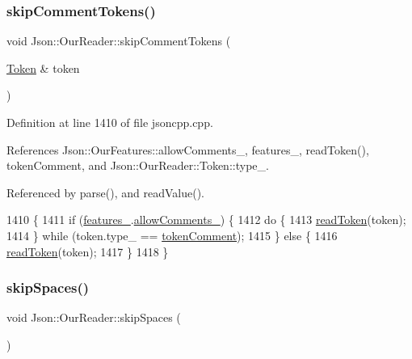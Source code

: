 \subsubsection{\texorpdfstring{skip\+Comment\+Tokens()}{skipCommentTokens()}}
{\footnotesize\ttfamily void Json\+::\+Our\+Reader\+::skip\+Comment\+Tokens (\begin{DoxyParamCaption}\item[{\hyperlink{class_json_1_1_our_reader_1_1_token}{Token} \&}]{token }\end{DoxyParamCaption})\hspace{0.3cm}{\ttfamily [private]}}



Definition at line 1410 of file jsoncpp.\+cpp.



References Json\+::\+Our\+Features\+::allow\+Comments\+\_\+, features\+\_\+, read\+Token(), token\+Comment, and Json\+::\+Our\+Reader\+::\+Token\+::type\+\_\+.



Referenced by parse(), and read\+Value().


\begin{DoxyCode}
1410                                               \{
1411   \textcolor{keywordflow}{if} (\hyperlink{class_json_1_1_our_reader_a2714302d5cc54ca2ce4118ea51c0397a}{features\_}.\hyperlink{class_json_1_1_our_features_ac71bb7ba7363d3b05ed76602b036ce33}{allowComments\_}) \{
1412     \textcolor{keywordflow}{do} \{
1413       \hyperlink{class_json_1_1_our_reader_a0d1e66da47fe2e85f5033c59326dfdc3}{readToken}(token);
1414     \} \textcolor{keywordflow}{while} (token.type\_ == \hyperlink{class_json_1_1_our_reader_a15116f7276ddf1e7a2cc3cbefa884dcca777fb6589fdbe225bc10a1e49a090da9}{tokenComment});
1415   \} \textcolor{keywordflow}{else} \{
1416     \hyperlink{class_json_1_1_our_reader_a0d1e66da47fe2e85f5033c59326dfdc3}{readToken}(token);
1417   \}
1418 \}
\end{DoxyCode}
\mbox{\label{class_json_1_1_our_reader_a6fbc6d58a4505e5ccadf330b57b17ca5}} 
\subsubsection{\texorpdfstring{skip\+Spaces()}{skipSpaces()}}
{\footnotesize\ttfamily void Json\+::\+Our\+Reader\+::skip\+Spaces (\begin{DoxyParamCaption}{ }\end{DoxyParamCaption})\hspace{0.3cm}{\ttfamily [private]}}




